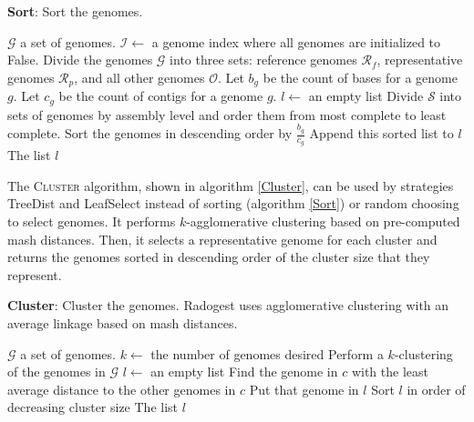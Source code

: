 \documentclass[12pt, letterpaper]{article}
\begin{document}
\begin{algorithm}[h!]
\caption{\textbf{Sort}: Sort the genomes.}
\label{Sort}
\begin{algorithmic}
\State $\mathcal{G}$ a set of genomes.
\State $\mathcal{I} \gets$ a genome index where all genomes are initialized to False.
\State Divide the genomes $\mathcal{G}$ into three sets: reference genomes $\mathcal{R}_f$, representative genomes $\mathcal{R}_p$, and all other genomes $\mathcal{O}$.
\State Let $b_g$ be the count of bases for a genome $g$.
\State Let $c_g$ be the count of contigs for a genome $g$.
\State $l \gets$ an empty list 
\State Divide $\mathcal{S}$ into sets of genomes by assembly level and order them from most complete to least complete. 
\State Sort the genomes in descending order by $\frac{b_g}{c_g}$
\State Append this sorted list to $l$
\EndFor
\EndFor
\State \Return The list $l$
\EndProcedure
\end{algorithmic}
\end{algorithm}


\newpage

The \textsc{Cluster} algorithm, shown in algorithm \ref{Cluster}, can be used by strategies TreeDist and LeafSelect instead of sorting (algorithm \ref{Sort}) or random choosing to select genomes.  It performs $k$-agglomerative clustering based on pre-computed mash distances.  Then, it selects a representative genome for each cluster and returns the genomes sorted in descending order of the cluster size that they represent.

\begin{algorithm}[h!]
\caption{\textbf{Cluster}: Cluster the genomes.  Radogest uses agglomerative clustering with an average linkage based on mash distances.}
\label{Cluster}
\begin{algorithmic}
\State $\mathcal{G}$ a set of genomes.
\State $k \gets$ the number of genomes desired 
\State Perform a $k$-clustering of the genomes in $\mathcal{G}$
\State $l \gets$ an empty list
 
\State Find the genome in $c$ with the least average distance to the other genomes in $c$
\State Put that genome in $l$
\EndFor
\State Sort $l$ in order of decreasing cluster size
\State \Return The list $l$
\EndProcedure
\end{algorithmic}
\end{algorithm}
\end{document}
